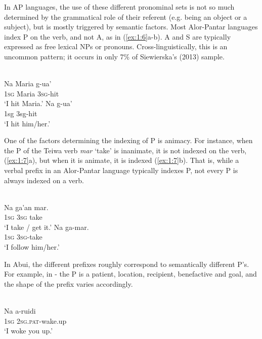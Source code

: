 In AP languages, the use of these different pronominal sets is not so much determined by the grammatical role of their referent (e.g. being an object or a subject), but is mostly triggered by semantic factors. Most Alor-Pantar languages index P on the verb, and not A, as in (\ref{ex:1:6}a-b). A and S are typically expressed as free lexical NPs or pronouns. Cross-linguistically, this is an uncommon pattern; it occurs in only 7\% of Siewierska's (2013) sample.\nocite{Siewierska2013}



\ea%
\label{ex:1:6}
\\
\ea
\gll Na  Maria  g-ua' \\
 1\textsc{sg} Maria  \textsc{3sg-}hit     \\
\glt  `I hit Maria.'
\ex
\gll Na  g-ua' \\
 1sg  3sg-hit    \\
\glt  `I hit him/her.'
\z
\z
 


One of the factors determining the indexing of P is animacy. For instance, when the P of the Teiwa verb \textit{mar} `take' is inanimate, it is not indexed on the verb, (\ref{ex:1:7}a), but when it  is animate, it is indexed (\ref{ex:1:7}b). That is, while a verbal prefix in an Alor-Pantar language typically indexes P, not every P is always indexed on a verb.



\ea%
\label{ex:1:7}
\\
\ea
\gll Na  ga'an  mar. \\
  1\textsc{sg} 3\textsc{sg} take     \\
\glt `I take / get it.'
\ex
\gll Na  ga-mar. \\
1\textsc{sg} 3\textsc{sg}{}-take  \\
\glt  `I follow him/her.'
\z
\z
  


In Abui, the different prefixes roughly correspond to semantically different P's. For example, in - the P is a patient, location, recipient, benefactive and goal, and the shape of the prefix varies accordingly.



\ea%
\label{ex:1:8}
 \\
\gll Na   a-ruidi  \\
 \textsc{1sg}   \textsc{2sg.pat}-wake.up  \\
\glt  `I woke you up.' 
\z
            



